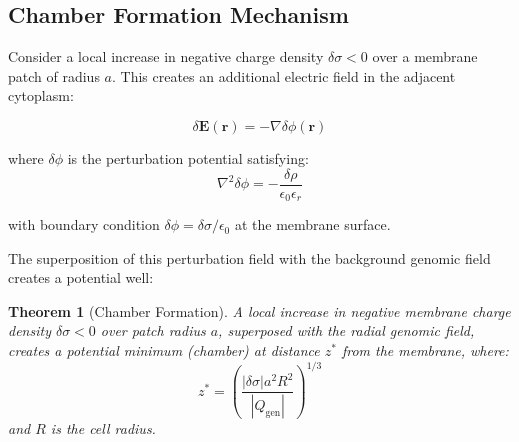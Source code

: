 \documentclass[twocolumn,10pt,aps,prd,superscriptaddress,floatfix,nofootinbib]{revtex4-2}
\newtheorem{theorem}{Theorem}[section]
\theoremstyle{remark}
\begin{document}
\subsection{Chamber Formation Mechanism}

Consider a local increase in negative charge density $\delta\sigma < 0$ over a membrane patch of radius $a$. This creates an additional electric field in the adjacent cytoplasm:

\begin{equation}
\delta\mathbf{E}(\mathbf{r}) = -\nabla\delta\phi(\mathbf{r})
\end{equation}

where $\delta\phi$ is the perturbation potential satisfying:
\begin{equation}
\nabla^2 \delta\phi = -\frac{\delta\rho}{\epsilon_0\epsilon_r}
\end{equation}

with boundary condition $\delta\phi = \delta\sigma/\epsilon_0$ at the membrane surface.

The superposition of this perturbation field with the background genomic field creates a potential well:

\begin{theorem}[Chamber Formation]
\label{thm:chamber_formation}
A local increase in negative membrane charge density $\delta\sigma < 0$ over patch radius $a$, superposed with the radial genomic field, creates a potential minimum (chamber) at distance $z^*$ from the membrane, where:
\begin{equation}
z^* = \left(\frac{|\delta\sigma| a^2 R^2}{|Q_{\mathrm{gen}}|}\right)^{1/3}
\label{eq:chamber_distance}
\end{equation}
and $R$ is the cell radius.
\end{theorem}
\end{document}
